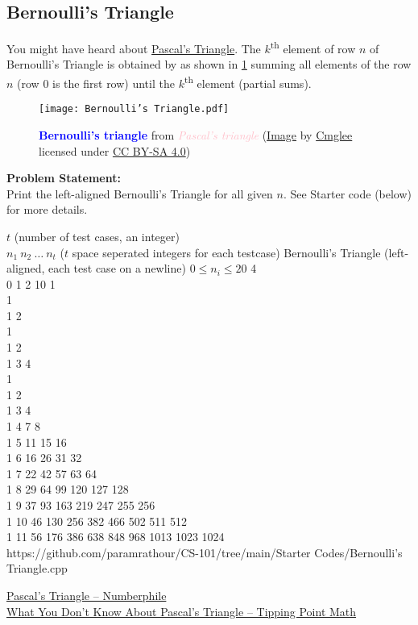 \subsection{Bernoulli's Triangle}{\label{pp:bernoullistriangle}}
You might have heard about \href{https://youtu.be/0iMtlus-afo}{Pascal's Triangle}. 
The $k$\textsuperscript{th} element of row $n$ of Bernoulli's Triangle is obtained by as shown in \ref{fig:bernoullistriangle} summing all elements of the row $n$ (row $0$ is the first row) until the $k$\textsuperscript{th} element (partial sums).
\begin{figure}[H]
	\centering
	\texttt{[image: Bernoulli's Triangle.pdf]}
	\caption{\textbf{\textcolor{blue}{Bernoulli's triangle}} from \textit{\textcolor{pink}{Pascal's triangle}} (\href{https://bit.ly/bernoullis-triangle}{Image} by \href{https://commons.wikimedia.org/wiki/User:Cmglee}{Cmglee} licensed under \href{https://creativecommons.org/licenses/by-sa/4.0/}{CC BY-SA 4.0})}
	\label{fig:bernoullistriangle}
\end{figure}
\vspace{-1.5em}
\textbf{Problem Statement:}\\
Print the left-aligned Bernoulli's Triangle for all given $n$. See Starter code (below) for more details.
\begin{testcases}
	{$t$ \hfill(number of test cases, an integer)\\$n_1\ n_2\ \ldots\ n_t$ \hfill($t$ space seperated integers for each testcase)}
	{Bernoulli's Triangle \hfill(left-aligned, each test case on a newline)}
	{$0 \leq n_i \leq 20$}
	{4\\0 1 2 10}
	{1\\[1em]1\\1 2\\[1em]1\\1 2\\1 3 4\\[1em]1\\1 2\\1 3 4\\1 4 7 8\\1 5 11 15 16\\1 6 16 26 31 32\\1 7 22 42 57 63 64\\1 8 29 64 99 120 127 128\\1 9 37 93 163 219 247 255 256\\1 10 46 130 256 382 466 502 511 512\\1 11 56 176 386 638 848 968 1013 1023 1024}
	{https://github.com/paramrathour/CS-101/tree/main/Starter Codes/Bernoulli's Triangle.cpp}
\end{testcases}
\begin{funvideo}
\href{https://youtu.be/0iMtlus-afo}{Pascal's Triangle -- Numberphile}\\
\href{https://youtu.be/J0I1NuxUcpQ}{What You Don't Know About Pascal's Triangle -- Tipping Point Math}
\end{funvideo}